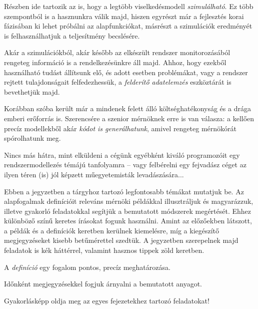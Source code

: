 \begin{pelda}
	Részben ide tartozik az is, hogy a legtöbb viselkedésmodell \emph{szimulálható}. Ez több szempontból is a hasznunkra válik majd, hiszen egyrészt már a fejlesztés korai fázisában ki lehet próbálni az alapfunkciókat, másrészt a szimulációk eredményét is felhasználhatjuk a teljesítmény becslésére.
	
	Akár a szimulációkból, akár később az elkészült rendszer monitorozásából rengeteg információ is a rendelkezésünkre áll majd. Ahhoz, hogy ezekből használható tudást állítsunk elő, és adott esetben problémákat, vagy a rendszer rejtett tulajdonságait felfedezhessük, a \emph{felderítő adatelemzés} eszköztárát is bevethetjük majd.
	
	Korábban szóba került már a mindenek felett álló költséghatékonyság és a drága emberi erőforrás is. Szerencsére a szenior mérnöknek erre is van válasza: a kellően precíz modellekből akár \emph{kódot is generálhatunk}, amivel rengeteg mérnökórát spórolhatunk meg.
	
	Nincs más hátra, mint elküldeni a cégünk egyébként kiváló programozóit egy rendszermodellezés témájú tanfolyamra -- vagy felbérelni egy fejvadász céget az ilyen téren (is) jól képzett műegyetemisták levadászására...
\end{pelda}

Ebben a jegyzetben a tárgyhoz tartozó legfontosabb témákat mutatjuk be. Az alapfogalmak definícióit releváns mérnöki példákkal illusztráljuk és magyarázzuk, illetve gyakorló feladatokkal segítjük a bemutatott módszerek megértését.
Ehhez különböző színű keretes írásokat fogunk használni. Amint az előzőekben látszott, a példák és a definíciók keretben kerülnek kiemelésre, míg a kiegészítő megjegyzéseket kisebb betűmérettel szedtük. A jegyzetben szerepelnek majd feladatok is kék háttérrel, valamint hasznos tippek zöld keretben.

\begin{definicio}
	A \emph{definíció} egy fogalom pontos, precíz meghatározása.
\end{definicio}

\begin{megjegyzes}
	Időnként megjegyzésekkel fogjuk árnyalni a bemutatott anyagot.
\end{megjegyzes}

\begin{feladat}
	Gyakorlásképp oldja meg az egyes fejezetekhez tartozó feladatokat!
\end{feladat}

